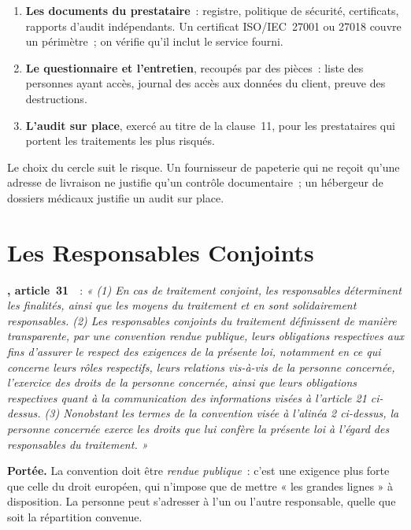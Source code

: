 \begin{enumerate}
    \item \textbf{Les documents du prestataire}~: registre, politique de
          sécurité, certificats, rapports d'audit indépendants. Un
          certificat ISO/IEC~27001 ou 27018 couvre un périmètre~; on vérifie
          qu'il inclut le service fourni.
    \item \textbf{Le questionnaire et l'entretien}, recoupés par des pièces~:
          liste des personnes ayant accès, journal des accès aux données du
          client, preuve des destructions.
    \item \textbf{L'audit sur place}, exercé au titre de la clause~11, pour
          les prestataires qui portent les traitements les plus risqués.
\end{enumerate}

Le choix du cercle suit le risque. Un fournisseur de papeterie qui ne
reçoit qu'une adresse de livraison ne justifie qu'un contrôle documentaire~;
un hébergeur de dossiers médicaux justifie un audit sur place.

\section{Les Responsables Conjoints}
\label{sec:c10-conjoints}

\begin{boxjuris}
\textbf{, article~31}~\cite{loi2024017}~:
\textit{« (1) En cas de traitement conjoint, les responsables déterminent
les finalités, ainsi que les moyens du traitement et en sont solidairement
responsables. (2) Les responsables conjoints du traitement définissent de
manière transparente, par une convention rendue publique, leurs
obligations respectives aux fins d'assurer le respect des exigences de la
présente loi, notamment en ce qui concerne leurs rôles respectifs, leurs
relations vis-à-vis de la personne concernée, l'exercice des droits de la
personne concernée, ainsi que leurs obligations respectives quant à la
communication des informations visées à l'article 21 ci-dessus.
(3) Nonobstant les termes de la convention visée à l'alinéa 2 ci-dessus,
la personne concernée exerce les droits que lui confère la présente loi à
l'égard des responsables du traitement. »}

\smallskip
\textbf{Portée.} La convention doit être \textit{rendue publique}~: c'est
une exigence plus forte que celle du droit européen, qui n'impose que de
mettre « les grandes lignes » à disposition. La personne peut s'adresser à
l'un ou l'autre responsable, quelle que soit la répartition convenue.
\end{boxjuris}


